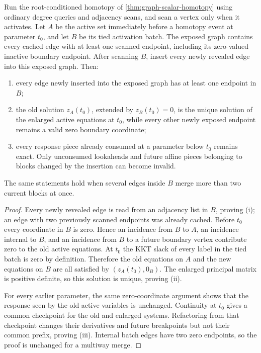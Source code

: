 \begin{lemma}
\label{lem:causal-block-zero-prefix}
Run the root-conditioned homotopy of
\cref{thm:graph-scalar-homotopy} using ordinary degree queries and adjacency
scans, and scan a vertex only when it activates.  Let $A$ be the active set
immediately before a homotopy event at parameter $t_0$, and let $B$ be its
tied activation batch.  The exposed graph contains every cached edge with at
least one scanned endpoint, including its zero-valued inactive boundary
endpoint.  After scanning $B$, insert every newly revealed edge into this
exposed graph.  Then:
\begin{enumerate}[label=(\roman*),leftmargin=*]
 \item every edge newly inserted into the exposed graph has at least one
 endpoint in $B$;
 \item the old solution $z_A(t_0)$, extended by $z_B(t_0)=0$, is the unique
 solution of the enlarged active equations at $t_0$, while every other newly
 exposed endpoint remains a valid zero boundary coordinate;
 \item every response piece already consumed at a parameter below $t_0$
 remains exact.  Only unconsumed lookaheads and future affine pieces belonging
 to blocks changed by the insertion can become invalid.
\end{enumerate}
The same statements hold when several edges inside $B$ merge more than two
current blocks at once.
\end{lemma}

\begin{proof}
Every newly revealed edge is read from an adjacency list in $B$, proving
(i); an edge with two previously scanned endpoints was already cached.  Before
$t_0$ every coordinate in $B$ is zero.  Hence an incidence from $B$ to $A$,
an incidence internal to $B$, and an incidence from $B$ to a future boundary
vertex contribute zero to the old active equations.  At $t_0$ the
KKT slack of every label in the tied batch is zero by definition.  Therefore
the old equations on $A$ and the new equations on $B$ are all satisfied by
$(z_A(t_0),0_B)$.  The enlarged principal matrix is positive definite, so
this solution is unique, proving (ii).

For every earlier parameter, the same zero-coordinate argument shows that
the response seen by the old active variables is unchanged.  Continuity at
$t_0$ gives a common checkpoint for the old and enlarged systems.  Refactoring
from that checkpoint changes their derivatives and future breakpoints but
not their common prefix, proving (iii).  Internal batch edges have two zero
endpoints, so the proof is unchanged for a multiway merge.
\end{proof}

